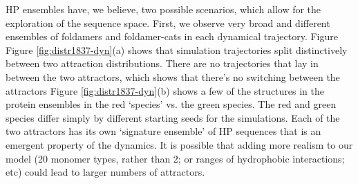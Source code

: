 \documentclass[5p,times]{elsarticle}
\begin{document}
HP ensembles have, we believe, two possible scenarios, which allow for the exploration of the 
sequence space.  First, we observe very broad and different ensembles of foldamers and 
foldamer-cats in each dynamical trajectory.  Figure  Figure 
\ref{fig:distr1837-dyn}(a) shows that simulation trajectories split distinctively between two 
attraction distributions. There are no trajectories that lay in between the two attractors, which 
shows that there's no switching between the attractors  Figure 
\ref{fig:distr1837-dyn}(b) shows a few of the structures in the protein ensembles in the red 
`species' vs. the green species.  The red and green species differ simply by different starting 
seeds for the simulations.  Each of the two attractors has its own `signature ensemble' of HP 
sequences that is an emergent property of the dynamics.  It is possible that adding more realism to 
our model (20 monomer types, rather than 2; or ranges of hydrophobic interactions; etc) could lead 
to larger numbers of attractors.
 
\end{document}
